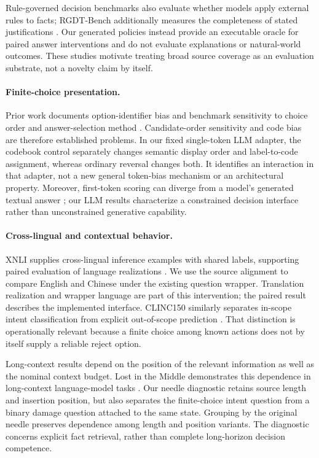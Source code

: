 Rule-governed decision benchmarks also evaluate whether models apply external rules to facts; RGDT-Bench additionally measures the completeness of stated justifications \citep{rgdtbench}. Our generated policies instead provide an executable oracle for paired answer interventions and do not evaluate explanations or natural-world outcomes. These studies motivate treating broad source coverage as an evaluation substrate, not a novelty claim by itself.

\paragraph{Finite-choice presentation.}
Prior work documents option-identifier bias and benchmark sensitivity to choice order and answer-selection method \citep{mcq,benchmarksensitivity}. Candidate-order sensitivity and code bias are therefore established problems. In our fixed single-token LLM adapter, the codebook control separately changes semantic display order and label-to-code assignment, whereas ordinary reversal changes both. It identifies an interaction in that adapter, not a new general token-bias mechanism or an architectural property. Moreover, first-token scoring can diverge from a model's generated textual answer \citep{firsttoken}; our LLM results characterize a constrained decision interface rather than unconstrained generative capability.

\paragraph{Cross-lingual and contextual behavior.}
XNLI supplies cross-lingual inference examples with shared labels, supporting paired evaluation of language realizations \citep{xnli}. We use the source alignment to compare English and Chinese under the existing question wrapper. Translation realization and wrapper language are part of this intervention; the paired result describes the implemented interface. CLINC150 similarly separates in-scope intent classification from explicit out-of-scope prediction \citep{clinc}. That distinction is operationally relevant because a finite choice among known actions does not by itself supply a reliable reject option.

Long-context results depend on the position of the relevant information as well as the nominal context budget. Lost in the Middle demonstrates this dependence in long-context language-model tasks \citep{middle}. Our needle diagnostic retains source length and insertion position, but also separates the finite-choice intent question from a binary damage question attached to the same state. Grouping by the original needle preserves dependence among length and position variants. The diagnostic concerns explicit fact retrieval, rather than complete long-horizon decision competence.

